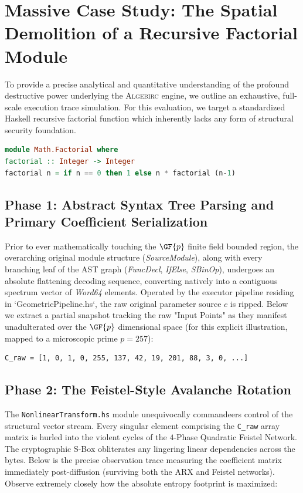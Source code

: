 \section{Massive Case Study: The Spatial Demolition of a Recursive Factorial Module}
\label{sec:casestudy}

To provide a precise analytical and quantitative understanding of the profound destructive power underlying the \textsc{Algebirc} engine, we outline an exhaustive, full-scale execution trace simulation. For this evaluation, we target a standardized Haskell recursive factorial function which inherently lacks any form of structural security foundation.

\begin{lstlisting}[language=Haskell, caption={Original Bare-Metal Factorial Module}]
module Math.Factorial where
factorial :: Integer -> Integer
factorial n = if n == 0 then 1 else n * factorial (n-1)
\end{lstlisting}

\subsection{Phase 1: Abstract Syntax Tree Parsing and Primary Coefficient Serialization}
Prior to ever mathematically touching the $\GF{p}$ finite field bounded region, the overarching original module structure (\textit{SourceModule}), along with every branching leaf of the AST graph (\textit{FuncDecl}, \textit{IfElse}, \textit{SBinOp}), undergoes an absolute flattening decoding sequence, converting natively into a contiguous spectrum vector of \textit{Word64} elements. Operated by the executor pipeline residing in `GeometricPipeline.hs`, the raw original parameter source $c$ is ripped.
Below we extract a partial snapshot tracking the raw "Input Points" as they manifest unadulterated over the $\GF{p}$ dimensional space (for this explicit illustration, mapped to a microscopic prime $p = 257$):
\begin{verbatim}
C_raw = [1, 0, 1, 0, 255, 137, 42, 19, 201, 88, 3, 0, ...]
\end{verbatim}

\subsection{Phase 2: The Feistel-Style Avalanche Rotation}
The \texttt{NonlinearTransform.hs} module unequivocally commandeers control of the structural vector stream. Every singular element comprising the \texttt{C\_raw} array matrix is hurled into the violent cycles of the $4$-Phase Quadratic Feistel Network. The cryptographic S-Box obliterates any lingering linear dependencies across the bytes.
Below is the precise observation trace measuring the coefficient matrix immediately post-diffusion (surviving both the ARX and Feistel networks). Observe extremely closely how the absolute entropy footprint is maximized:

